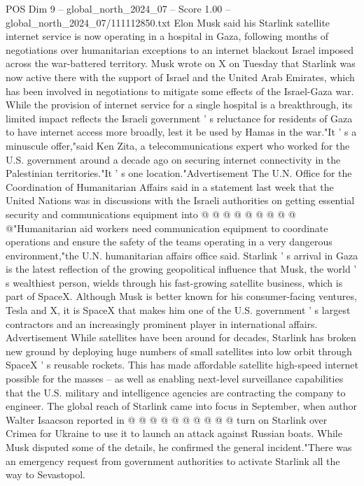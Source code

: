 \begin{textsample}{POS Dim 9 – global\_north\_2024\_07 – Score 1.00 – global\_north\_2024\_07/111112850.txt}  \label{ex:f9_pos_287}
Elon Musk said his Starlink satellite internet service is now operating in a hospital in Gaza, following months of negotiations over humanitarian exceptions to an internet blackout Israel imposed across the war-battered territory.
Musk wrote on X on Tuesday that Starlink was now active there with the support of Israel and the United Arab Emirates, which has been involved in negotiations to mitigate some effects of the Israel-Gaza war.
While the provision of internet service for a single hospital is a breakthrough, its limited impact reflects the Israeli government ' s reluctance for residents of Gaza to have internet access more broadly, lest it be used by Hamas in the war."It ' s a minuscule offer,"said Ken Zita, a telecommunications expert who worked for the U.S. government around a decade ago on securing internet connectivity in the Palestinian territories."It ' s one location."Advertisement The U.N.
Office for the Coordination of Humanitarian Affairs said in a statement last week that the United Nations was in discussions with the Israeli authorities on getting essential security and communications equipment into @ @ @ @ @ @ @ @ @ @"Humanitarian aid workers need communication equipment to coordinate operations and ensure the safety of the teams operating in a very dangerous environment,"the U.N. humanitarian affairs office said.
Starlink ' s arrival in Gaza is the latest reflection of the growing geopolitical influence that Musk, the world ' s wealthiest person, wields through his fast-growing satellite business, which is part of SpaceX.
Although Musk is better known for his consumer-facing ventures, Tesla and X, it is SpaceX that makes him one of the U.S. government ' s largest contractors and an increasingly prominent player in international affairs.
Advertisement While satellites have been around for decades, Starlink has broken new ground by deploying huge numbers of small satellites into low orbit through SpaceX ' s reusable rockets.
This has made affordable satellite high-speed internet possible for the masses -- as well as enabling next-level surveillance capabilities that the U.S. military and intelligence agencies are contracting the company to engineer.
The global reach of Starlink came into focus in September, when author Walter Isaacson reported in @ @ @ @ @ @ @ @ @ @ turn on Starlink over Crimea for Ukraine to use it to launch an attack against Russian boats.
While Musk disputed some of the details, he confirmed the general incident."There was an emergency request from government authorities to activate Starlink all the way to Sevastopol.

\end{textsample}
